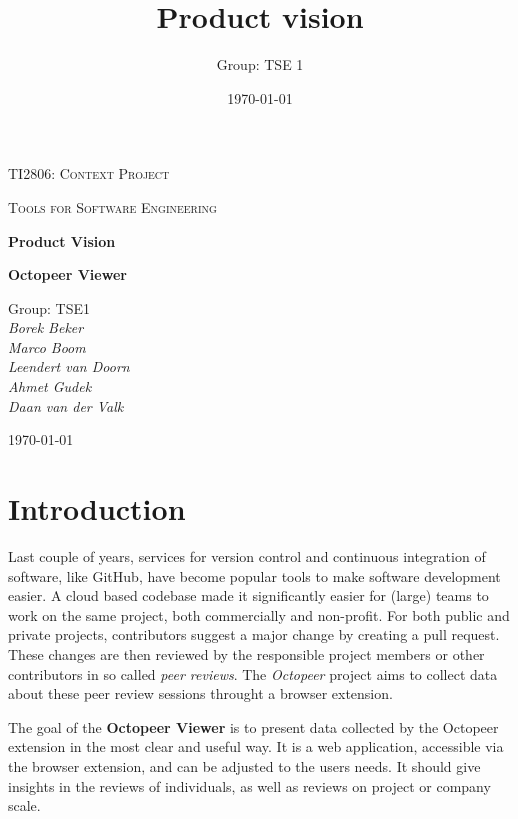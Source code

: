 \documentclass{article}
\title{Product vision}
\author{Group: TSE 1}
\date{\today}
\begin{document}
\begin{titlepage}
	\centering
	{\scshape\LARGE TI2806: Context Project \par}
	\vspace{1cm}
	{\scshape\Large Tools for Software Engineering\par}
	\vspace{1.5cm}
	{\huge\bfseries Product Vision\par}
	\vspace{0.5cm}
	{\Large\bfseries Octopeer Viewer\par}
	\vspace{2cm}
	{\Large
	  Group: TSE1 \\
	  \vspace{0.5cm}
	  \itshape
        Borek Beker \\
        Marco Boom \\
        Leendert van Doorn \\
        Ahmet Gudek \\
        Daan van der Valk \\
    \par}

	\vfill

	{\large \today\par}
\end{titlepage}

\section{Introduction}
Last couple of years, services for version control and continuous integration of software, like GitHub, have become popular tools to make software development easier. A cloud based codebase made it significantly easier for (large) teams to work on the same project, both commercially and non-profit. For both public and private projects, contributors suggest a major change by creating a pull request. These changes are then reviewed by the responsible project members or other contributors in so called \textit{peer reviews}. The \textit{Octopeer} project aims to collect data about these peer review sessions throught a browser extension.

The goal of the \textbf{Octopeer Viewer} is to present data collected by the Octopeer extension in the most clear and useful way. It is a web application, accessible via the browser extension, and can be adjusted to the users needs. It should give insights in the reviews of individuals, as well as reviews on project or company scale.
\end{document}
